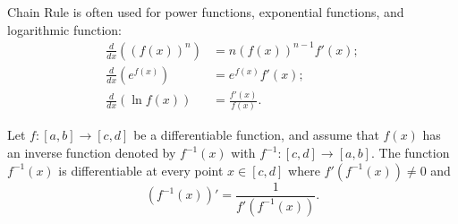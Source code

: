 Chain Rule is often used for power functions, exponential functions, and logarithmic function:
\begin{align}
    \frac{d}{dx} ((f(x))^n) &= n (f(x))^{n - 1} f'(x); \label{eq:formula:chain-rule:power} \\
    \frac{d}{dx} (e^{f(x)}) &= e^{f(x)} f'(x); \label{eq:formula:chain-rule:exp} \\
    \frac{d}{dx} (\ln f(x)) &= \frac{f'(x)}{f(x)}. \label{eq:formula:chain-rule:log}
\end{align}

\begin{lemma}
    Let $ f : [a, b] \rightarrow [c, d] $ be a differentiable function, and assume that $ f(x) $ has an inverse function denoted by $ f^{-1}(x) $ with $ f^{-1} : [c, d] \rightarrow [a, b] $.
    The function $ f^{-1}(x) $ is differentiable at every point $ x \in [c, d] $ where $ f'(f^{-1}(x)) \neq 0 $ and
    \begin{equation}
        (f^{-1}(x))' = \frac{1}{f'(f^{-1}(x))}.
        \label{eq:lemma:inverse}
    \end{equation}
\end{lemma}

